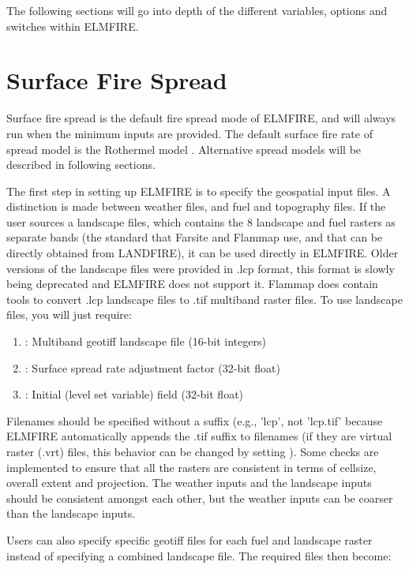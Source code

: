 The following sections will go into depth of the different variables, options and switches within ELMFIRE.

\section{Surface Fire Spread}
\label{surface_fire_spread}

Surface fire spread is the default fire spread mode of ELMFIRE, and will always run when the minimum inputs are provided. The default surface fire rate of spread model is the Rothermel model \cite{rothermelMathematicalModelPredicting1972}. Alternative spread models will be described in following sections. 

The first step in setting up ELMFIRE is to specify the geospatial input files. A distinction is made between weather files, and fuel and topography files. If the user sources a landscape files, which contains the 8 landscape and fuel rasters as separate bands (the standard that Farsite and Flammap use, and that can be directly obtained from LANDFIRE), it can be used directly in ELMFIRE. Older versions of the landscape files were provided in .lcp format, this format is slowly being deprecated and ELMFIRE does not support it. Flammap does contain tools to convert .lcp landscape files to .tif multiband raster files. To use landscape files, you will just require:


\begin{enumerate}
    \item {}: Multiband geotiff landscape file (16-bit integers)
    \item {}: Surface spread rate adjustment factor (32-bit float)
    \item {}: Initial (level set variable) field (32-bit float)
\end{enumerate}

Filenames should be specified without a suffix (e.g., 'lcp', not 'lcp.tif' because ELMFIRE automatically appends the .tif suffix to filenames (if they are virtual raster (.vrt) files, this behavior can be changed by setting ). Some checks are implemented to ensure that all the rasters are consistent in terms of cellsize, overall extent and projection. The weather inputs and the landscape inputs should be consistent amongst each other, but the weather inputs can be coarser than the landscape inputs.

Users can also specify specific geotiff files for each fuel and landscape raster instead of specifying a combined landscape file. The required files then become:

